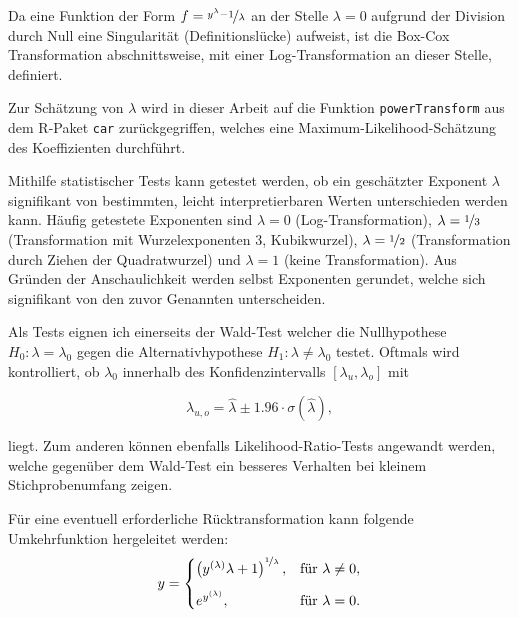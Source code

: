 Da eine Funktion der Form $f = \nicefrac{y^\lambda-1}{\lambda}$ an der Stelle $\lambda=0$  aufgrund der Division durch Null eine Singularität (Definitionslücke) aufweist, ist die Box-Cox Transformation abschnittsweise, mit einer Log-Transformation an dieser Stelle, definiert.

Zur Schätzung von $\lambda$ wird in dieser Arbeit auf die Funktion \verb|powerTransform| aus dem R-Paket \verb|car| \citep{car} zurückgegriffen, welches eine Maximum-Likelihood-Schätzung des Koeffizienten durchführt.

Mithilfe statistischer Tests kann getestet werden, ob ein geschätzter Exponent $\lambda$ signifikant von bestimmten, leicht interpretierbaren Werten unterschieden werden kann. Häufig getestete Exponenten sind $\lambda=0$ (Log-Transformation), $\lambda=\nicefrac{1}{3}$ (Transformation mit Wurzelexponenten 3, Kubikwurzel), $\lambda=\nicefrac{1}{2}$ (Transformation durch Ziehen der Quadratwurzel) und $\lambda=1$ (keine Transformation). Aus Gründen der Anschaulichkeit werden selbst Exponenten gerundet, welche sich signifikant von den zuvor Genannten unterscheiden. 

Als Tests eignen ich einerseits der Wald-Test welcher die Nullhypothese $H_0\colon \lambda=\lambda_0$ gegen die Alternativhypothese $H_1\colon \lambda\neq\lambda_0$ testet. Oftmals wird kontrolliert, ob  $\lambda_0$ innerhalb des Konfidenzintervalls $[\lambda_u, \lambda_o]$ mit  

\begin{equation*}
\lambda_{u,o} = \hat{\lambda} \pm \num{1.96} \cdot \sigma\left(\hat{\lambda}\right),
\end{equation*}

liegt. Zum anderen können ebenfalls Likelihood-Ratio-Tests angewandt werden, welche gegenüber dem Wald-Test ein besseres Verhalten bei kleinem Stichprobenumfang zeigen. 
 
Für eine eventuell erforderliche Rücktransformation kann folgende Umkehrfunktion hergeleitet werden:
\begin{equation*}
y =
\begin{cases}
\left(y^{(\lambda)}\lambda+1\right)^{\nicefrac{1}{\lambda}}, &\text{für } \lambda \neq 0, \\[8pt] 
e^{y^{(\lambda)}} , &\text{für } \lambda = 0.
\end{cases}
\end{equation*}

